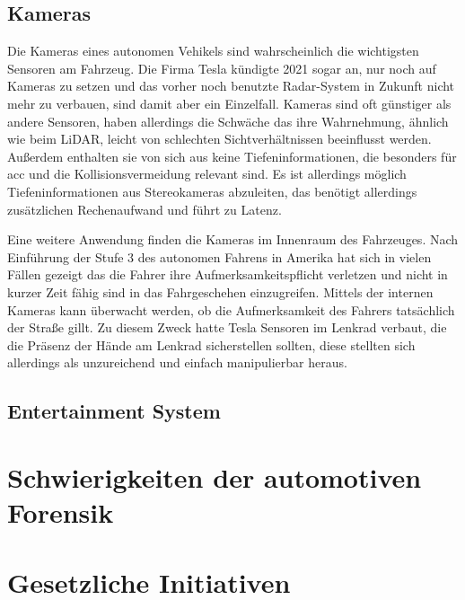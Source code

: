 \documentclass[conference,compsoc,final,a4paper]{IEEEtran}
\begin{document}
\subsection{Kameras}

Die Kameras eines autonomen Vehikels sind wahrscheinlich die wichtigsten Sensoren am Fahrzeug.
Die Firma Tesla kündigte 2021 sogar an, nur noch auf Kameras zu setzen und das vorher noch benutzte Radar-System in Zukunft nicht mehr zu verbauen, sind damit aber ein Einzelfall.\cite{Koellner2022}
Kameras sind oft günstiger als andere Sensoren, haben allerdings die Schwäche das ihre Wahrnehmung, ähnlich wie beim LiDAR, leicht von schlechten Sichtverhältnissen beeinflusst werden.
Außerdem enthalten sie von sich aus keine Tiefeninformationen, die besonders für \ac{acc} und die Kollisionsvermeidung relevant sind.
Es ist allerdings möglich Tiefeninformationen aus Stereokameras abzuleiten, das benötigt allerdings zusätzlichen Rechenaufwand und führt zu Latenz.~\cite{Petit2022}

Eine weitere Anwendung finden die Kameras im Innenraum des Fahrzeuges.
Nach Einführung der Stufe 3 des autonomen Fahrens in Amerika hat sich in vielen Fällen gezeigt das die Fahrer
ihre Aufmerksamkeitspflicht verletzen und nicht in kurzer Zeit fähig sind in das Fahrgeschehen einzugreifen.
Mittels der internen Kameras kann überwacht werden, ob die Aufmerksamkeit des Fahrers tatsächlich der Straße gillt.
Zu diesem Zweck hatte Tesla Sensoren im Lenkrad verbaut, die die Präsenz der Hände am Lenkrad sicherstellen sollten,
diese stellten sich allerdings als unzureichend und einfach manipulierbar heraus.~\cite{Trudell2021}

\subsection{Entertainment System}


\section{Schwierigkeiten der automotiven Forensik}



\section{Gesetzliche Initiativen}

\end{document}
